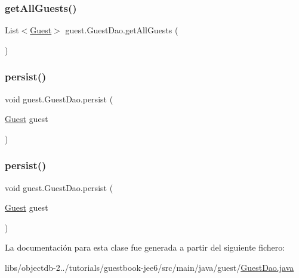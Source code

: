 \subsubsection{\texorpdfstring{getAllGuests()}{getAllGuests()}\hspace{0.1cm}{\footnotesize\ttfamily [2/2]}}
{\footnotesize\ttfamily List$<$\mbox{\hyperlink{classguest_1_1_guest}{Guest}}$>$ guest.\+Guest\+Dao.\+get\+All\+Guests (\begin{DoxyParamCaption}{ }\end{DoxyParamCaption})}

\mbox{\label{classguest_1_1_guest_dao_a66dea98c577adb8b65be3f0f89862f60}} 
\subsubsection{\texorpdfstring{persist()}{persist()}\hspace{0.1cm}{\footnotesize\ttfamily [1/2]}}
{\footnotesize\ttfamily void guest.\+Guest\+Dao.\+persist (\begin{DoxyParamCaption}\item[{\mbox{\hyperlink{classguest_1_1_guest}{Guest}}}]{guest }\end{DoxyParamCaption})}

\mbox{\label{classguest_1_1_guest_dao_a66dea98c577adb8b65be3f0f89862f60}} 
\subsubsection{\texorpdfstring{persist()}{persist()}\hspace{0.1cm}{\footnotesize\ttfamily [2/2]}}
{\footnotesize\ttfamily void guest.\+Guest\+Dao.\+persist (\begin{DoxyParamCaption}\item[{\mbox{\hyperlink{classguest_1_1_guest}{Guest}}}]{guest }\end{DoxyParamCaption})}



La documentación para esta clase fue generada a partir del siguiente fichero\+:\begin{DoxyCompactItemize}
\item 
libs/objectdb-\/2../tutorials/guestbook-\/jee6/src/main/java/guest/\mbox{\hyperlink{guestbook-jee6_2src_2main_2java_2guest_2_guest_dao_8java}{Guest\+Dao.\+java}}\end{DoxyCompactItemize}
